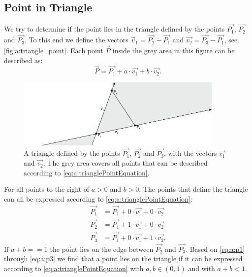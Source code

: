\subsection*{Point in Triangle}

We try to determine if the point  lies in the triangle defined by the points $\vec{P_1}$, $\vec{P_2}$ and $\vec{P_3}$. To this end we define the vectors $\vec{v}_1 = \vec{P_2} - \vec{P_1}$ and $\vec{v_2} = \vec{P_3} - \vec{P_1}$, see \autoref{fig:a:triangle_point}. Each point $\vec{P}$ inside the grey area in this figure can be described as:
\begin{equation} \label{eq:a:trianglePointEquation}
	\vec{P} = \vec{P_1} + a \cdot \vec{v_1} + b \cdot \vec{v_2}.
\end{equation}

\begin{figure}
	\centering
	\includegraphics[width=0.9\textwidth, frame]{./img/a_triangle_point-01}
	\caption{A triangle defined by the points $\vec{P_1}$, $\vec{P_2}$ and $\vec{P_3}$, with the vectors $\vec{v_1}$ and $\vec{v_2}$. The grey area covers all points that can be described according to \eqref{eq:a:trianglePointEquation}.}
	\label{fig:a:triangle_point}
\end{figure}

For all points to the right of  $a > 0$ and $b > 0$. The points that define the triangle can all be expressed according to \eqref{eq:a:trianglePointEquation}:
\begin{align}
	\vec{P_1} &= \vec{P_1} + 0 \cdot \vec{v_1} + 0 \cdot \vec{v_2} \label{eq:a:p1}\\ 
	\vec{P_2} &= \vec{P_1} + 1 \cdot \vec{v_1} + 0 \cdot \vec{v_2} \label{eq:a:p2}\\ 
	\vec{P_3} &= \vec{P_1} + 0 \cdot \vec{v_1} + 1 \cdot \vec{v_2} \label{eq:a:p3}.
\end{align}
If $a + b == 1$ the point lies on the edge between $\vec{P_2}$ and $\vec{P_3}$. Based on \autoref{eq:a:p1} through \ref{eq:a:p3} we find that a point  lies on the triangle if it can be expressed according to \eqref{eq:a:trianglePointEquation} with $a,b \in (0,1)$ and with $a + b < 1$. 

